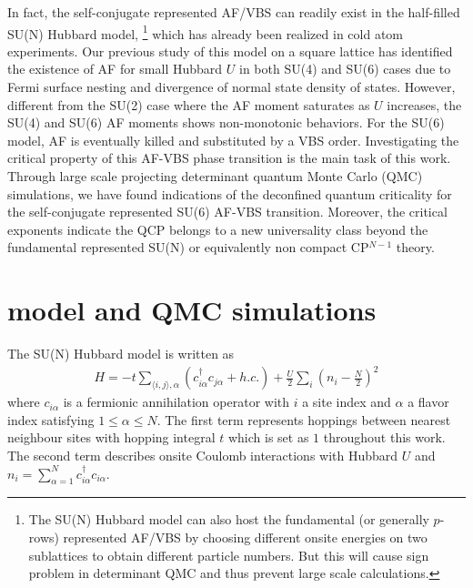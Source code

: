 \documentclass[twocolumn,superscriptaddress]{revtex4-1}
\begin{document}
In fact, the self-conjugate represented AF/VBS can readily exist in the half-filled SU(N) Hubbard model, \cite{Honerkamp2004,Assaad2005,Cai2013a,Cai2013,Wang2014b,Zhou2014} \footnote{The SU(N) Hubbard model can also host the fundamental (or generally $p$-rows) represented AF/VBS by choosing different onsite energies on two sublattices to obtain different particle numbers. But this will cause sign problem in determinant QMC and thus prevent large scale calculations.} which has already been realized in cold atom experiments. \cite{Taie2012,Zhang2014,Cazalilla2014} Our previous study\cite{Wang2014b} of this model on a square lattice has identified the existence of AF for small Hubbard $U$ in both SU(4) and SU(6) cases due to Fermi surface nesting and divergence of normal state density of states. However, different from the SU(2) case where the AF moment saturates as $U$ increases, the SU(4) and SU(6) AF moments shows non-monotonic behaviors. For the SU(6) model, AF is eventually killed and substituted by a VBS order. Investigating the critical property of this AF-VBS phase transition is the main task of this work. Through large scale projecting determinant quantum Monte Carlo (QMC) simulations, we have found indications of the deconfined quantum criticality for the self-conjugate represented SU(6) AF-VBS transition. Moreover, the critical exponents indicate the QCP belongs to a new universality class beyond the fundamental represented SU(N) or equivalently non compact CP$^{N-1}$ theory.



\section{model and QMC simulations}
The SU(N) Hubbard model is written as
\begin{eqnarray}
  H=-t\sum_{\langle i,j\rangle,\alpha}\left(c_{i\alpha}^\dag c_{j\alpha}
  +h.c.\right)+\frac{U}{2}\sum_{i}\left(n_i-\frac{N}{2}\right)^2
  \label{eq:hamilton}
\end{eqnarray}
where $c_{i\alpha}$ is a fermionic annihilation operator with $i$ a site index and $\alpha$ a flavor index satisfying $1\le\alpha\le N$. The first term represents hoppings between nearest neighbour sites with hopping integral $t$ which is set as $1$ throughout this work. The second term describes onsite Coulomb interactions with Hubbard $U$ and $n_i=\sum_{\alpha=1}^{N} c_{i\alpha}^\dag c_{i\alpha}$. 
\end{document}
